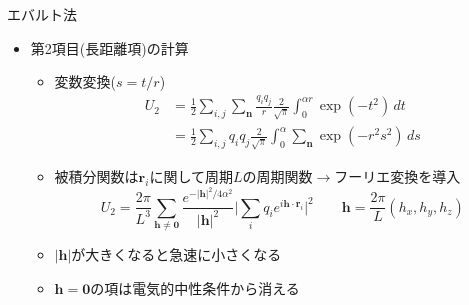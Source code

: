 
\begin{frame}[t,fragile]{エバルト法}
  \begin{itemize}
  \item 第2項目(長距離項)の計算
    \begin{itemize}
    \item 変数変換($s=t/r$)
      \[
      \begin{split}
        U_2 &= \frac{1}{2} \sum_{i,j} \sum_{\mathbf{n}} \frac{q_i q_j}{r} \frac{2}{\sqrt{\pi}} \int_0^{\alpha r} \exp(-t^2) \, dt \\
        &= \frac{1}{2} \sum_{i,j} q_i q_j  \frac{2}{\sqrt{\pi}} \int_0^{\alpha} \sum_{\mathbf{n}} \exp(-r^2 s^2) \, ds
        \end{split}
      \]
    \item 被積分関数は$\mathbf{r}_i$に関して周期$L$の周期関数$\rightarrow$フーリエ変換を導入
      \[
      U_2 = \frac{2\pi}{L^3} \sum_{\mathbf{h} \ne \mathbf{0}} \frac{e^{-|\mathbf{h}|^2/4\alpha^2}}{|\mathbf{h}|^2} \Big| \sum_i q_i e^{i\mathbf{h} \cdot \mathbf{r}_i} \Big|^2 \qquad \mathbf{h} = \frac{2\pi}{L}(h_x, h_y, h_z)
      \]
    \item $|\mathbf{h}|$が大きくなると急速に小さくなる
    \item $\mathbf{h} = \mathbf{0}$の項は電気的中性条件から消える
    \end{itemize}
  \end{itemize}
\end{frame}

